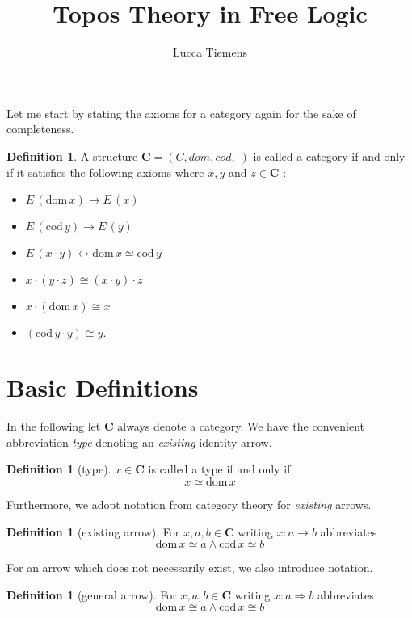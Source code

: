 \documentclass[a4paper, 11pt]{article}
\title{Topos Theory in Free Logic}
\author{Lucca Tiemens}
\theoremstyle{definition}
\newtheorem{definition}[theorem]{Definition}
\newcommand{\cat}{%
	\mathbf %
}
\newcommand{\E}[1]{E \, (#1)}
\newcommand{\domain}[ 1 ]{%
	\mathrm{dom} \, #1 %
}
\newcommand{\codomain}[ 1 ]{%
	\mathrm{cod} \, #1%
}
\begin{document}
\maketitle

Let me start by stating the axioms for a category again for the sake of completeness.

\begin{definition}

	A structure $\cat C = (C, dom, cod, \cdot)$ is called a category if and only if it satisfies the following axioms where $x, y$ and $z \in \cat C$ :
	\begin{itemize}
		\item $\E{\domain{x}} \longrightarrow \E{x}$
		\item $\E{\codomain{y}} \longrightarrow \E{y}$
		\item $\E{x\cdot y} \longleftrightarrow \domain{x} \simeq \codomain{y}$
		\item $x \cdot (y \cdot z) \cong (x \cdot y) \cdot z$
		\item $x \cdot (\domain{x}) \cong x$
		\item $(\codomain{y} \cdot y) \cong y.$ 
	\end{itemize}

\end{definition} 

\section{Basic Definitions}

In the following let $\cat C$ always denote a category. We have the convenient abbreviation \emph{type} denoting an \emph{existing} identity arrow.

\begin{definition}[type]
	$x \in \cat C$ is called a type if and only if \[x \simeq \domain{x}\] 
\end{definition}

\noindent Furthermore, we adopt notation from category theory for \emph{existing} arrows.

\begin{definition}[existing arrow]
	For $x,a,b \in \cat C$ writing $x:a \rightarrow b$ abbreviates 
	\[ \domain{x} \simeq a \wedge \codomain{x} \simeq b \]
\end{definition}

\noindent For an arrow which does not necessarily exist, we also introduce notation.

\begin{definition}[general arrow]
	For $x,a,b \in \cat C$ writing $x:a \Rightarrow b$ abbreviates 
	\[ \domain{x} \cong a \wedge \codomain{x} \cong b \]
\end{definition}
\end{document}
